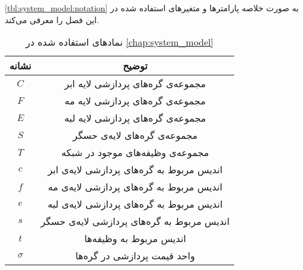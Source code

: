     
    \cref{tbl:system_model:notation} به صورت خلاصه پارامتر‌ها و متغیر‌های استفاده شده در این فصل را معرفی می‌کند.
    \begin{table}[h]
      \caption{نماد‌های استفاده شده در \cref{chap:system_model}}
      \begin{tabularx}{\textwidth}{|c|C|} \hline
        نشانه                & توضیح                                                                                     \\ \hline
        $C$                  & مجموعه‌ی گره‌های پردازشی لایه ابر                                                                       \\ \hline
        $F$                  & مجموعه‌ی گره‌های پردازشی لایه مه                                                                       \\ \hline
        $E$                  & مجموعه‌ی گره‌های پردازشی لایه لبه                                                                       \\ \hline
        $S$                  & مجموعه‌ی گره‌های لایه‌ی حسگر                                                                     \\ \hline                        
        $T$                  & مجموعه‌ی وظیفه‌های موجود در شبکه                                                                  \\ \hline
		$c$                  & اندیس مربوط به گره‌های پردازشی لایه‌ی ابر                                                                       \\ \hline
		$f$                  & اندیس مربوط به گره‌های پردازشی لایه‌ی مه                                                                       \\ \hline
		$e$                  & اندیس مربوط به گره‌های پردازشی لایه‌ی لبه                                                                       \\ \hline
		$s$                  & اندیس مربوط به گره‌های پردازشی لایه‌ی حسگر                                                                     \\ \hline                        
		$t$                  & اندیس مربوط به وظیفه‌ها                                                                  \\ \hline
        $\sigma$        	 & واحد قیمت پردازشی در گره‌ها                                                                \\ \hline
        

\end{tabularx}
\end{table}
